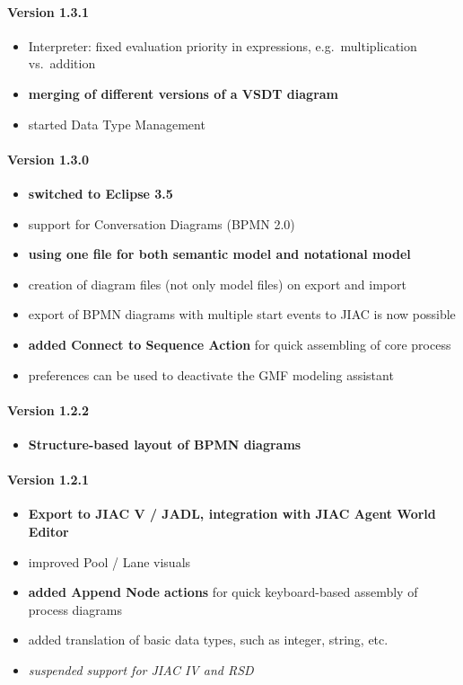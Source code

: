\paragraph{Version 1.3.1}
\begin{itemize}
	\item Interpreter: fixed evaluation priority in expressions, e.g.\ multiplication vs.\ addition
	\item \textbf{merging of different versions of a VSDT diagram}
	\item started Data Type Management
\end{itemize}

\paragraph{Version 1.3.0}
\begin{itemize}
	\item \textbf{switched to Eclipse 3.5}
	\item support for Conversation Diagrams (BPMN 2.0)
	\item \textbf{using one file for both semantic model and notational model}
	\item creation of diagram files (not only model files) on export and import
	\item export of BPMN diagrams with multiple start events to JIAC is now possible
	\item \textbf{added Connect to Sequence Action} for quick assembling of core process
	\item preferences can be used to deactivate the GMF modeling assistant
\end{itemize}

\paragraph{Version 1.2.2}
\begin{itemize}
	\item \textbf{Structure-based layout of BPMN diagrams}
\end{itemize}

\paragraph{Version 1.2.1}
\begin{itemize}
	\item \textbf{Export to JIAC V / JADL, integration with JIAC Agent World Editor}
	\item improved Pool / Lane visuals
	\item \textbf{added Append Node actions} for quick keyboard-based assembly of process diagrams
	\item added translation of basic data types, such as integer, string, etc.
	\item \textit{suspended support for JIAC IV and RSD}
\end{itemize}


